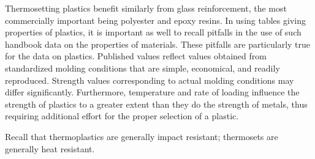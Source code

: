 \documentclass[a4paper,openany,12pt]{book}
\begin{document}
Thermosetting plastics benefit similarly from glass reinforcement, the
most commercially important being polyester and epoxy resins. In using
tables giving properties of plastics, it is important as well to recall
pitfalls in the use of such handbook data on the properties of
materials. These pitfalls are particularly true for the data on
plastics. Published values reflect values obtained from standardized
molding conditions that are simple, economical, and readily reproduced.
Strength values corresponding to actual molding conditions may differ
significantly. Furthermore, temperature and rate of loading influence
the strength of plastics to a greater extent than they do the strength
of metals, thus requiring additional effort for the proper selection of
a plastic.

Recall that thermoplastics are generally impact resistant; thermosets
are generally heat resistant.
\end{document}
